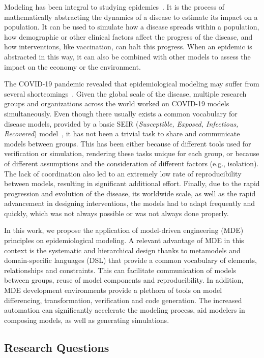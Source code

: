 Modeling has been integral to studying epidemics~\cite{ding2021value}. It is the process of mathematically abstracting the dynamics of a disease to estimate its impact on a population. It can be used to simulate how a disease spreads within a population, how demographic or other clinical factors affect the progress of the disease, and how interventions, like vaccination, can halt this progress. When an epidemic is abstracted in this way, it can also be combined with other models to assess the impact on the economy or the environment. 

The COVID-19 pandemic revealed that epidemiological modeling may suffer from several shortcomings~\cite{crepey2022challenges}. Given the global scale of the disease, multiple research groups and organizations across the world worked on COVID-19 models simultaneously. Even though there usually exists a common vocabulary for disease models, provided by a basic SEIR (\textit{Susceptible, Exposed, Infectious, Recovered}) model~\cite{he2020seir}, it has not been a trivial task to share and communicate models between groups. This has been either because of different tools used for verification or simulation, rendering these tasks unique for each group, or because of different assumptions and the consideration of different factors (e.g., isolation). The lack of coordination also led to an extremely low rate of reproducibility between models, resulting in significant additional effort. Finally, due to the rapid progression and evolution of the disease, its worldwide scale, as well as the rapid advancement in designing interventions, the models had to adapt frequently and quickly, which was not always possible or was not always done properly.

In this work, we propose the application of model-driven engineering (MDE) principles on epidemiological modeling. A relevant advantage of MDE in this context is the systematic and hierarchical design thanks to metamodels and domain-specific languages (DSL) that provide a common vocabulary of elements, relationships and constraints. This can facilitate communication of models between groups, reuse of model components and reproducibility. In addition, MDE development environments provide a plethora of tools on model differencing, transformation, verification and code generation. The increased automation can significantly accelerate the modeling process, aid modelers in composing models, as well as generating simulations.

\subsection{Research Questions}

